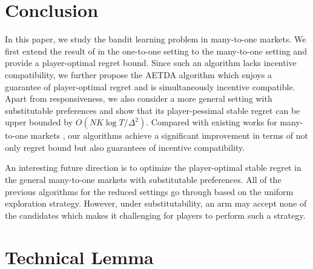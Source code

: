 \documentclass[letterpaper]{article} %
\begin{document}
\section{Conclusion}\label{sec:conclusion}


In this paper, we study the bandit learning problem in many-to-one markets. 
We first extend the result of \citet{kong2023player} in the one-to-one setting to the many-to-one setting and provide a player-optimal regret bound. Since such an algorithm lacks incentive compatibility, we further propose the AETDA algorithm which enjoys a guarantee of player-optimal regret and is simultaneously incentive compatible. 
Apart from responsiveness, we also consider a more general setting with substitutable preferences and show that its player-pessimal stable regret can be upper bounded by $O(NK\log T/\Delta^2)$. 
Compared with existing works for many-to-one markets \citep{wang2022bandit}, our algorithms achieve a significant improvement in terms of not only regret bound but also guarantees of incentive compatibility.  


An interesting future direction is to optimize the player-optimal stable regret in the general many-to-one markets with substitutable preferences. All of the previous algorithms for the reduced settings go through based on the uniform exploration strategy. However, under substitutability, an arm may accept none of the candidates which makes it challenging for players to perform such a strategy. 












\appendix
\onecolumn













\section{Technical Lemma}
\end{document}
